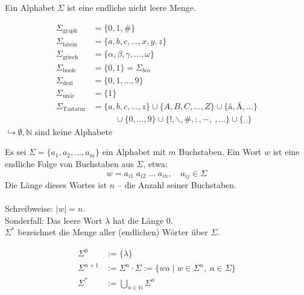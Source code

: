 \documentclass[runningheads]{llncs}
\begin{document}
\begin{definition}
    Ein Alphabet $\Sigma$ ist eine endliche nicht leere Menge.
\end{definition}

\begin{example}
    \begin{align}
        \Sigma_{\text{graph}} &= \{ 0, 1, \# \} \\
        \Sigma_{\text{latein}} &= \{ a, b, c, \dots, x, y, z \} \\
        \Sigma_{\text{griech}} &= \{ \alpha, \beta, \gamma, \dots, \omega \} \\
        \Sigma_{\text{boole}} &= \{0, 1\} = \Sigma_{bin} \\
        \Sigma_{\text{dezi}} &= \{0, 1, \dots, 9\} \\
        \Sigma_{\text{unär}} &= \{1\} \\
        \Sigma_{\text{Tastatur}} &= \{a, b, c, \dots, z\} \cup \{A, B, C, \dots, Z\} \cup \{\text{ä}, \text{Ä}, \dots\} \\
        &\phantom{==} \cup \{0, \dots, 9\} \cup \{!, \backslash, \#, ;, -, ~, \dots\} \cup \{\text{␣}\}
    \end{align}
    $\hookrightarrow \emptyset, \mathbb{N}$ sind keine Alphabete
\end{example}

\begin{definition}
    Es sei $\Sigma = \{a_1, a_2, \dots, a_m\}$ ein Alphabet mit $m$ Buchstaben. Ein Wort $w$ ist eine endliche Folge von Buchstaben aus $\Sigma$, etwa:
    \[ w = a_{i1} \; a_{i2} \; \dots \; a_{in}, \quad a_{ij} \in \Sigma \]
    Die Länge dieses Wortes ist $n$ -- die Anzahl seiner Buchstaben. \\
    \\ 
    Schreibweise: $|w| = n$. \\
    Sonderfall: Das leere Wort $\lambda$ hat die Länge 0. \\
    $\Sigma^*$ bezeichnet die Menge aller (endlichen) Wörter über $\Sigma$.

    \begin{align}
        \Sigma^0 &:= \{\lambda\} \\
        \Sigma^{n+1} &:= \Sigma^n \cdot \Sigma := \{wa\;|\;w \in \Sigma^n,\;a \in \Sigma\} \\
        \Sigma^* &:= \bigcup_{n\in \mathbb{N}} \Sigma^n
    \end{align}
\end{definition}
\end{document}
